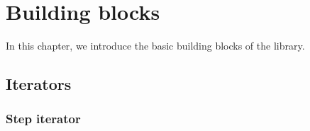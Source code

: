 %
%
%
%

\chapter{Building blocks}
\label{chap:Building blocks}

In this chapter, we introduce the basic building blocks of the library.

\section{Iterators}
\label{sec:Iterators}

\subsection{Step iterator}
\label{sub:Step iterator}

